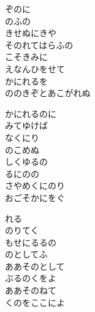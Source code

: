 \documentclass[10pt,b5j]{tarticle} %
\begin{document}
\begin{enumerate} %
    \begin{minipage}[c]{\blocksize}

        \vspace{\linespace}
        \item
        ぞのに\\
        のふの\\
        きせぬにきや\\
        そのれてはらふの\\
        こそきみに\\
        えなんひをせて\\
        かにれるを\\
        ののきぞとあこがれぬ\\
        
        \vspace{\linespace}
        \item
        かにれるのに\\
        みてゆけば\\
        なくにり\\
        のこめぬ\\
        しくゆるの\\
        るにのの\\
        さやめくにのり\\
        おごそかにをぐ\\
    
    \end{minipage}
    \begin{minipage}[c]{\blocksize}
        
        \vspace{\linespace}
        \item
        れる\\
        のりてく\\
        もせにるるの\\
        のとしてふ\\
        ああそのとして\\
        ぶるのくをよ\\
        ああそのねて\\
        くのをここによ\\
    

\end{minipage}
\end{enumerate}
\end{document}
